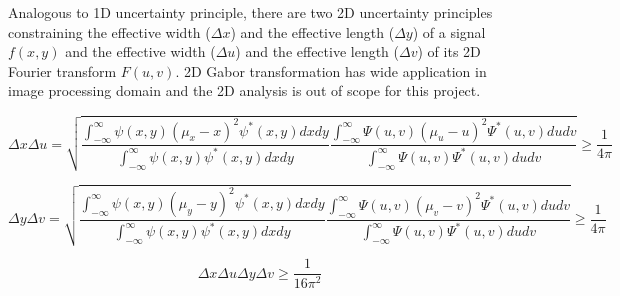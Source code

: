 Analogous to 1D uncertainty principle, there are two 2D uncertainty principles constraining the effective width ($\Delta x$) and the effective length ($\Delta y$) of a signal $f(x,y)$ and the effective width ($\Delta u$) and the effective length ($\Delta v$) of its 2D Fourier transform $F(u,v)$. 2D Gabor transformation has wide application in image processing domain and the 2D analysis is out of scope for this project.  


\begin{equation*}
\Delta x\Delta u = \sqrt{\frac{\int_{-\infty}^{\infty}{\psi(x,y)(\mu_x - x)^2\psi ^*(x,y)dxdy}}{\int_{-\infty}^{\infty}{\psi(x,y)\psi ^*(x,y)dxdy}} \frac{\int_{-\infty}^{\infty}{\Psi(u,v)(\mu_u - u)^2\Psi ^*(u,v)dudv}}{\int_{-\infty}^{\infty}{\Psi(u,v)\Psi ^*(u,v)dudv}}} \geq \frac{1}{4\pi}
\end{equation*}


\begin{equation*}
\Delta y\Delta v = \sqrt{\frac{\int_{-\infty}^{\infty}{\psi(x,y)(\mu_y - y)^2\psi ^*(x,y)dxdy}}{\int_{-\infty}^{\infty}{\psi(x,y)\psi ^*(x,y)dxdy}} \frac{\int_{-\infty}^{\infty}{\Psi(u,v)(\mu_v - v)^2\Psi ^*(u,v)dudv}}{\int_{-\infty}^{\infty}{\Psi(u,v)\Psi ^*(u,v)dudv}}} \geq \frac{1}{4\pi}
\end{equation*}

\begin{equation*}
\Delta x\Delta u  \Delta y\Delta v    \geq \frac{1}{16\pi^2}
\end{equation*}
